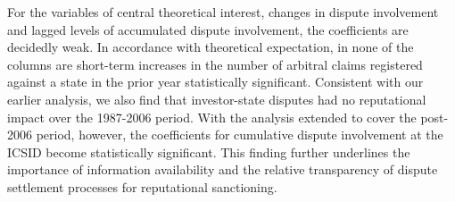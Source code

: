 \documentclass[12pt,onesided]{amsart}
\begin{document}
For the variables of central theoretical interest, changes in dispute involvement and lagged levels of accumulated dispute involvement, the coefficients are decidedly weak. In accordance with theoretical expectation, in none of the columns are short-term increases in the number of arbitral claims registered against a state in the prior year statistically significant. Consistent with our earlier analysis, we also find that investor-state disputes had no reputational impact over the 1987-2006 period. With the analysis extended to cover the post-2006 period, however, the coefficients for cumulative dispute involvement at the ICSID become statistically significant. This finding further underlines the importance of information availability and the relative transparency of dispute settlement processes for reputational sanctioning. 
\end{document}
